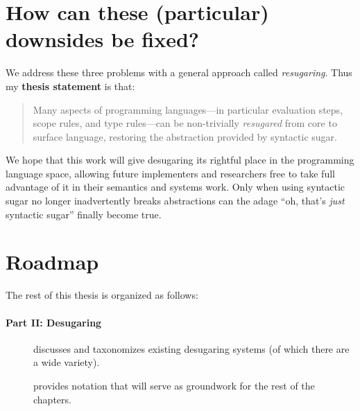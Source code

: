 \section{How can these (particular) downsides be fixed?}

We address these three problems with a general approach called
\emph{resugaring}. Thus my \textbf{thesis statement} is that:
\begin{quote}
Many aspects of programming languages---in particular evaluation
steps, scope rules, and type rules---can be non-trivially
\emph{resugared} from core to surface language, restoring the
abstraction provided by syntactic sugar.
\end{quote}

We hope that this work will give desugaring its rightful
place in the programming language space, allowing future implementers
and researchers free to take full advantage of it in their semantics
and systems work. Only when using syntactic sugar no longer
inadvertently breaks abstractions can the adage
``oh, that's \emph{just} syntactic sugar'' finally become true.

\section{Roadmap}

The rest of this thesis is organized as follows:
\paragraph{Part II: Desugaring}
\begin{description}
\item[] discusses and taxonomizes existing
  desugaring systems (of which there are a wide variety).
\item[] provides notation that
  will serve as groundwork for the rest of the chapters.
\end{description}
